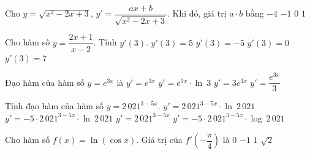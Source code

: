 \begin{ex}%
	Cho $y=\sqrt{x^2-2x+3}$, $y'=\dfrac{ax+b}{\sqrt{x^2-2x+3}}$. Khi đó,  giá trị $a\cdot b$ bằng
	 \choice
		 {$-4$}
		{\True $-1$} 
		 {$0$}
		 {$1$}
\end{ex}

\begin{ex}%
	Cho hàm  số $y=\dfrac{2x+1}{x-2}$. Tính $y'(3)$.
	 \choice
		 {$y'(3)=5$}
		{\True  $y'(3)=-5$}
		 {$y'(3)=0$}
		 {$y'(3)=7$}
\end{ex}

\begin{ex}%
	Đạo hàm  của hàm số $y=e^{3x}$ là
	 \choice
		{$y'=e^{3x}$} 
		{$y'=e^{3x} \cdot \ln~3$} 
		{\True  $y'=3e^{3x}$}
		{$y'=\dfrac{e^{3x}}{3}$} 
\end{ex}

\begin{ex}%
	Tính  đạo hàm của hàm số $y=2\, 021^{3-5x}$.
	\choice 
		{$y'=2\, 021^{3-5x}  \cdot \ln~2\, 021$}
		{\True  $y'=-5 \cdot 2\, 021^{3-5x} \cdot \ln~2\, 021$}
		{$y'=2\,  021^{3-5x}$}
		 {$y'=-5 \cdot 2\, 021^{3-5x} \cdot \log~2\, 021$}
\end{ex}

\begin{ex}%
	Cho hàm số $f(x)=\ln (\cos x)$. Giá trị của $f'\left(-\dfrac{\pi}{4} \right)$ là 
	 \choice
		 {$0$}
		{\True  $-1$}
		 {$1$}
		{$\sqrt{2}$} 
\end{ex}

